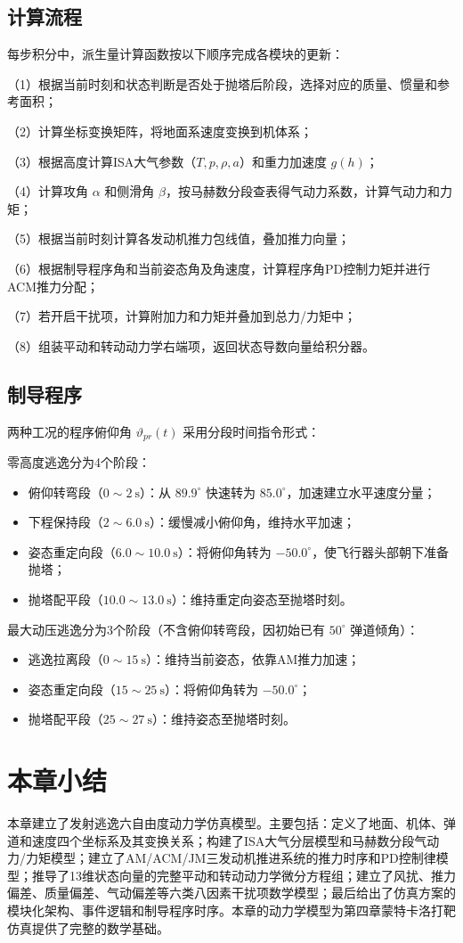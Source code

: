 \subsection{计算流程}

每步积分中，派生量计算函数按以下顺序完成各模块的更新：

（1）根据当前时刻和状态判断是否处于抛塔后阶段，选择对应的质量、惯量和参考面积；

（2）计算坐标变换矩阵，将地面系速度变换到机体系；

（3）根据高度计算ISA大气参数（$T,p,\rho,a$）和重力加速度 $g(h)$；

（4）计算攻角 $\alpha$ 和侧滑角 $\beta$，按马赫数分段查表得气动力系数，计算气动力和力矩；

（5）根据当前时刻计算各发动机推力包线值，叠加推力向量；

（6）根据制导程序角和当前姿态角及角速度，计算程序角PD控制力矩并进行ACM推力分配；

（7）若开启干扰项，计算附加力和力矩并叠加到总力/力矩中；

（8）组装平动和转动动力学右端项，返回状态导数向量给积分器。

\subsection{制导程序}

两种工况的程序俯仰角 $\vartheta_{pr}(t)$ 采用分段时间指令形式：

零高度逃逸分为4个阶段：
\begin{itemize}
    \item 俯仰转弯段（$0\sim2\ \mathrm s$）：从 $89.9^\circ$ 快速转为 $85.0^\circ$，加速建立水平速度分量；
    \item 下程保持段（$2\sim6.0\ \mathrm s$）：缓慢减小俯仰角，维持水平加速；
    \item 姿态重定向段（$6.0\sim10.0\ \mathrm s$）：将俯仰角转为 $-50.0^\circ$，使飞行器头部朝下准备抛塔；
    \item 抛塔配平段（$10.0\sim13.0\ \mathrm s$）：维持重定向姿态至抛塔时刻。
\end{itemize}

最大动压逃逸分为3个阶段（不含俯仰转弯段，因初始已有 $50^\circ$ 弹道倾角）：
\begin{itemize}
    \item 逃逸拉离段（$0\sim15\ \mathrm s$）：维持当前姿态，依靠AM推力加速；
    \item 姿态重定向段（$15\sim25\ \mathrm s$）：将俯仰角转为 $-50.0^\circ$；
    \item 抛塔配平段（$25\sim27\ \mathrm s$）：维持姿态至抛塔时刻。
\end{itemize}

\section{本章小结}

本章建立了发射逃逸六自由度动力学仿真模型。主要包括：定义了地面、机体、弹道和速度四个坐标系及其变换关系；构建了ISA大气分层模型和马赫数分段气动力/力矩模型；建立了AM/ACM/JM三发动机推进系统的推力时序和PD控制律模型；推导了13维状态向量的完整平动和转动动力学微分方程组；建立了风扰、推力偏差、质量偏差、气动偏差等六类八因素干扰项数学模型；最后给出了仿真方案的模块化架构、事件逻辑和制导程序时序。本章的动力学模型为第四章蒙特卡洛打靶仿真提供了完整的数学基础。
